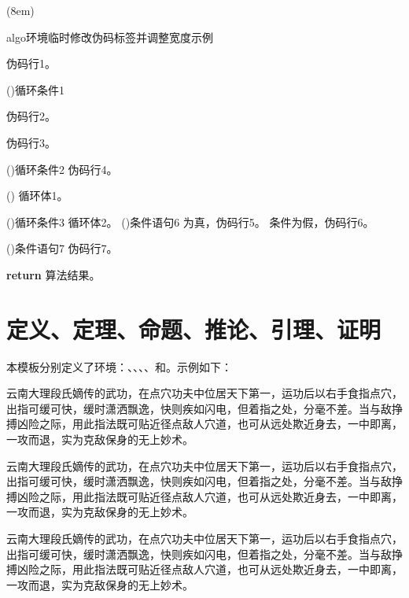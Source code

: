 \documentclass[print, promaster, vlined]{DissertUESTC}
\begin{document}
	\begin{algo}[!h](8em)
		\renewcommand{\algorithmcfname}{过程}  %
		\caption{algo环境临时修改伪码标签并调整宽度示例} \label{alg: algo环境修改伪码标签并调整宽度示例}
		伪码行1。
		
		\For(){循环条件1}{
			伪码行2。
			
			伪码行3。
			
			\DoWhile(){循环条件2}{
				伪码行4。
			}
			
			\Loop(){
				循环体1。
			}
			
			\Repeat(){循环条件3}{
				循环体2。
			}
			\eIf(){条件语句6}{
				为真，伪码行5。
			}{
				条件为假，伪码行6。
			}
			
			\If(){条件语句7}{
				伪码行7。
			}
		}
		\textbf{return} 算法结果。
	\end{algo}
	
	\clearpage
	\section{定义、定理、命题、推论、引理、证明}
	
	本模板分别定义了环境：、、、、和。示例如下：
	
	\begin{definition}
		云南大理段氏嫡传的武功，在点穴功夫中位居天下第一，运功后以右手食指点穴，出指可缓可快，缓时潇洒飘逸，快则疾如闪电，但着指之处，分毫不差。当与敌挣搏凶险之际，用此指法既可贴近径点敌人穴道，也可从远处欺近身去，一中即离，一攻而退，实为克敌保身的无上妙术。
	\end{definition}
	
	\begin{theorem}
		云南大理段氏嫡传的武功，在点穴功夫中位居天下第一，运功后以右手食指点穴，出指可缓可快，缓时潇洒飘逸，快则疾如闪电，但着指之处，分毫不差。当与敌挣搏凶险之际，用此指法既可贴近径点敌人穴道，也可从远处欺近身去，一中即离，一攻而退，实为克敌保身的无上妙术。
	\end{theorem}
	
	\begin{proposition}
		云南大理段氏嫡传的武功，在点穴功夫中位居天下第一，运功后以右手食指点穴，出指可缓可快，缓时潇洒飘逸，快则疾如闪电，但着指之处，分毫不差。当与敌挣搏凶险之际，用此指法既可贴近径点敌人穴道，也可从远处欺近身去，一中即离，一攻而退，实为克敌保身的无上妙术。
	\end{proposition}
	
\end{document}
